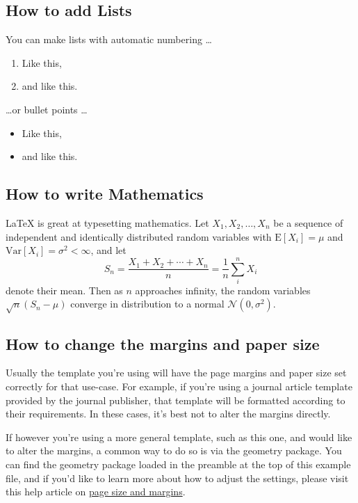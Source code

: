\documentclass{article}
\begin{document}
\subsection{How to add Lists}

You can make lists with automatic numbering \dots

\begin{enumerate}
\item Like this,
\item and like this.
\end{enumerate}
\dots or bullet points \dots
\begin{itemize}
\item Like this,
\item and like this.
\end{itemize}

\subsection{How to write Mathematics}

\LaTeX{} is great at typesetting mathematics. Let $X_1, X_2, \ldots, X_n$ be a sequence of independent and identically distributed random variables with $\text{E}[X_i] = \mu$ and $\text{Var}[X_i] = \sigma^2 < \infty$, and let
\[S_n = \frac{X_1 + X_2 + \cdots + X_n}{n}
      = \frac{1}{n}\sum_{i}^{n} X_i\]
denote their mean. Then as $n$ approaches infinity, the random variables $\sqrt{n}(S_n - \mu)$ converge in distribution to a normal $\mathcal{N}(0, \sigma^2)$.


\subsection{How to change the margins and paper size}

Usually the template you're using will have the page margins and paper size set correctly for that use-case. For example, if you're using a journal article template provided by the journal publisher, that template will be formatted according to their requirements. In these cases, it's best not to alter the margins directly.

If however you're using a more general template, such as this one, and would like to alter the margins, a common way to do so is via the geometry package. You can find the geometry package loaded in the preamble at the top of this example file, and if you'd like to learn more about how to adjust the settings, please visit this help article on \href{https://www.overleaf.com/learn/latex/page_size_and_margins}{page size and margins}.
\end{document}

